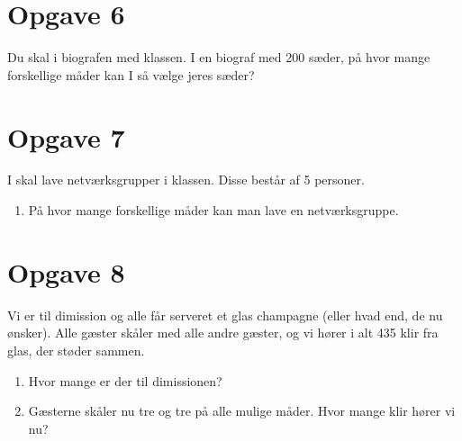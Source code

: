 \section*{Opgave 6}
Du skal i biografen med klassen. I en biograf med 200 sæder, på hvor mange forskellige måder kan I så vælge jeres sæder?

\section*{Opgave 7}
I skal lave netværksgrupper i klassen. Disse består af 5 personer.
\begin{enumerate}[label=\roman*)]
	\item På hvor mange forskellige måder kan man lave en netværksgruppe.
\end{enumerate}

\section*{Opgave 8}
Vi er til dimission og alle får serveret et glas champagne (eller hvad end, de nu ønsker). Alle gæster skåler med alle andre gæster, og vi hører i alt 435 klir fra glas, der støder sammen.
\begin{enumerate}[label=\roman*)]
	\item Hvor mange er der til dimissionen?
	\item Gæsterne skåler nu tre og tre på alle mulige måder. Hvor mange klir hører vi nu?
\end{enumerate}